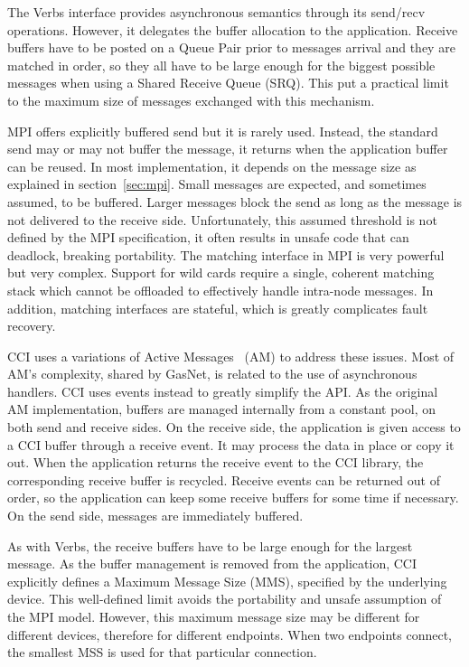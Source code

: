 The Verbs interface provides asynchronous semantics through its send/recv 
operations. However, it delegates the buffer allocation to the application. 
Receive buffers have to be posted on a Queue Pair prior to messages arrival 
and they are matched in order, so they all have to be large enough for the 
biggest possible messages when using a Shared Receive Queue (SRQ). 
This put a practical limit to the maximum size of messages exchanged with 
this mechanism.

MPI offers explicitly buffered send but it is rarely used. Instead, the 
standard send may or may not buffer the message, it returns when 
the application buffer can be reused. In most implementation, it 
depends on the message size as explained in section~\ref{sec:mpi}. 
Small messages are expected, and sometimes assumed, to be buffered. Larger 
messages block the send as long as the message is not delivered to the receive 
side. Unfortunately, this assumed threshold is not defined by the MPI 
specification, it often results in unsafe code that can deadlock, breaking 
portability. 
The matching interface in MPI is very powerful but very complex. Support 
for wild cards require a single, coherent matching stack which cannot be 
offloaded to effectively handle intra-node messages. In addition, matching 
interfaces are stateful, which is greatly complicates fault recovery.

CCI uses a variations of Active Messages~\cite{voneicken-isca92} (AM) 
to address these issues. 
Most of AM's complexity, shared by GasNet\cite{gasnet}, is related 
to the use of asynchronous handlers. CCI uses events instead to greatly 
simplify the API. As the original AM implementation, buffers are managed 
internally from a constant pool, on both send and receive sides. 
On the receive side, the application is given access to a CCI buffer through 
a receive event. It may process the data in place or copy it out. When the 
application returns the receive event to the CCI library, the corresponding 
receive buffer is recycled. Receive events can be returned out of order, so 
the application can keep some receive buffers for some time if necessary. 
On the send side, messages are immediately buffered.

As with Verbs, the receive buffers have to be large enough for the largest 
message. As the buffer management is removed from the application, CCI 
explicitly defines a Maximum Message Size (MMS), specified by the underlying  
device. This well-defined limit avoids the portability and unsafe assumption 
of the MPI model. However, this maximum message size may be different for 
different devices, therefore for different endpoints. When two endpoints 
connect, the smallest MSS is used for that particular connection.

